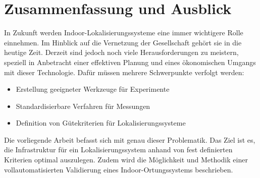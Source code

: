\chapter{Zusammenfassung und Ausblick}
In Zukunft werden Indoor-Lokalisierungssysteme eine immer wichtigere Rolle einnehmen. Im Hinblick auf die Vernetzung der Gesellschaft gehört sie in die heutige Zeit. Derzeit sind jedoch noch viele Herausforderungen zu meistern, speziell in Anbetracht einer effektiven Planung und eines ökonomischen Umgangs mit dieser Technologie. Dafür müssen mehrere Schwerpunkte verfolgt werden:
\begin{itemize}
\item Erstellung geeigneter Werkzeuge für Experimente
\item Standardisierbare Verfahren für Messungen
\item Definition von Gütekriterien für Lokalisierungssysteme
\end{itemize}
Die vorliegende Arbeit befasst sich mit genau dieser Problematik. Das Ziel ist es, die Infrastruktur für ein Lokalisierungssystem anhand von fest definierten Kriterien optimal auszulegen. Zudem wird die Möglichkeit und Methodik einer vollautomatisierten Validierung eines Indoor-Ortungssystems beschrieben.\\ \\

